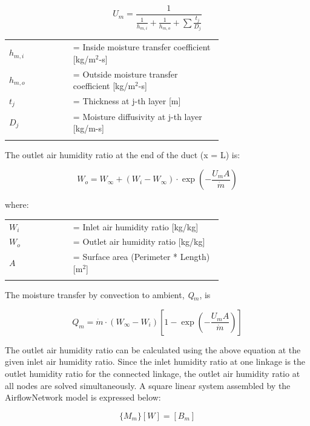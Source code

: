 \begin{equation}
U_m = \frac{1}{\frac{1}{h_{m,i}} + \frac{1}{h_{m,o}} + \sum {\frac{t_j}{D_j}} }
\end{equation}

\begin{tabular}{lp{0.7\linewidth}}
\\
$h_{m,i}$ &= Inside moisture transfer coefficient [kg/m\(^{2}\)-s]\\
$h_{m,o}$ &= Outside moisture transfer coefficient [kg/m\(^{2}\)-s]\\
$t_j$ &= Thickness at j-th layer [m]\\
$D_j$ &= Moisture diffusivity at j-th layer [kg/m-s]\\
\\
\end{tabular}

The outlet air humidity ratio at the end of the duct (x = L) is:

\begin{equation}
W_o = W_\infty + (W_i - W_\infty) \cdot \exp \left(- \frac{U_m A}{\dot{m}} \right)
\end{equation}

where:

\begin{tabular}{lp{0.7\linewidth}}
\\
$W_i$ &= Inlet air humidity ratio [kg/kg]\\
$W_o$ &= Outlet air humidity ratio [kg/kg]\\
$A$ &= Surface area (Perimeter * Length) [m\(^{2}\)]\\
\\
\end{tabular}

The moisture transfer by convection to ambient, \emph{Q\(_{m}\)}, is

\begin{equation}
Q_m = \dot{m} \cdot (W_\infty - W_i)\left[ 1 - \exp \left(- \frac{U_m A}{\dot{m}} \right) \right]
\end{equation}

The outlet air humidity ratio can be calculated using the above equation at the given inlet air humidity ratio. Since the inlet humidity ratio at one linkage is the outlet humidity ratio for the connected linkage, the outlet air humidity ratio at all nodes are solved simultaneously. A square linear system assembled by the AirflowNetwork model is expressed below:

\begin{equation}
\{M_m\} [W] = [B_m]
\end{equation}

